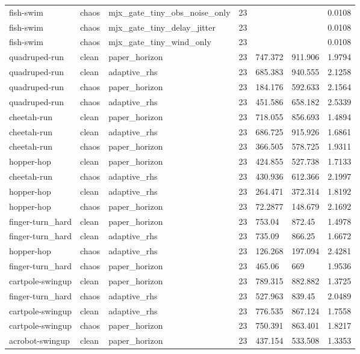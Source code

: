 \begin{tabular}{lllllll}
fish-swim & chaos & mjx\_gate\_tiny\_obs\_noise\_only & 23 &  &  & 0.0108 \\
fish-swim & chaos & mjx\_gate\_tiny\_delay\_jitter & 23 &  &  & 0.0108 \\
fish-swim & chaos & mjx\_gate\_tiny\_wind\_only & 23 &  &  & 0.0108 \\
quadruped-run & clean & paper\_horizon & 23 & 747.372 & 911.906 & 1.9794 \\
quadruped-run & clean & adaptive\_rhs & 23 & 685.383 & 940.555 & 2.1258 \\
quadruped-run & chaos & paper\_horizon & 23 & 184.176 & 592.633 & 2.1564 \\
quadruped-run & chaos & adaptive\_rhs & 23 & 451.586 & 658.182 & 2.5339 \\
cheetah-run & clean & paper\_horizon & 23 & 718.055 & 856.693 & 1.4894 \\
cheetah-run & clean & adaptive\_rhs & 23 & 686.725 & 915.926 & 1.6861 \\
cheetah-run & chaos & paper\_horizon & 23 & 366.505 & 578.725 & 1.9311 \\
hopper-hop & clean & paper\_horizon & 23 & 424.855 & 527.738 & 1.7133 \\
cheetah-run & chaos & adaptive\_rhs & 23 & 430.936 & 612.366 & 2.1997 \\
hopper-hop & clean & adaptive\_rhs & 23 & 264.471 & 372.314 & 1.8192 \\
hopper-hop & chaos & paper\_horizon & 23 & 72.2877 & 148.679 & 2.1692 \\
finger-turn\_hard & clean & paper\_horizon & 23 & 753.04 & 872.45 & 1.4978 \\
finger-turn\_hard & clean & adaptive\_rhs & 23 & 735.09 & 866.25 & 1.6672 \\
hopper-hop & chaos & adaptive\_rhs & 23 & 126.268 & 197.094 & 2.4281 \\
finger-turn\_hard & chaos & paper\_horizon & 23 & 465.06 & 669 & 1.9536 \\
cartpole-swingup & clean & paper\_horizon & 23 & 789.315 & 882.882 & 1.3725 \\
finger-turn\_hard & chaos & adaptive\_rhs & 23 & 527.963 & 839.45 & 2.0489 \\
cartpole-swingup & clean & adaptive\_rhs & 23 & 776.535 & 867.124 & 1.7558 \\
cartpole-swingup & chaos & paper\_horizon & 23 & 750.391 & 863.401 & 1.8217 \\
acrobot-swingup & clean & paper\_horizon & 23 & 437.154 & 533.508 & 1.3353 \\

\end{tabular}
